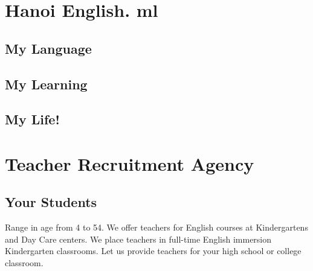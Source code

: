 \documentclass[11pt]{article}
\author{בנימן הגלילי}
\date{\today}
\title{}
\begin{document}
\tableofcontents

\section{Hanoi English. ml}
\label{sec:org0130066}
\subsection{My Language}
\label{sec:org08af7a9}
\subsection{My Learning}
\label{sec:org6558f73}
\subsection{My Life!}
\label{sec:org1363404}

\section{Teacher Recruitment Agency}
\label{sec:orgfb0fd92}
\subsection{Your Students}
\label{sec:orgb22d8b6}
Range in age from 4 to 54.  We offer teachers for English courses at Kindergartens and Day Care centers.
We place teachers in full-time English immersion Kindergarten classrooms.
Let us provide teachers for your high school or college classroom.
\end{document}
